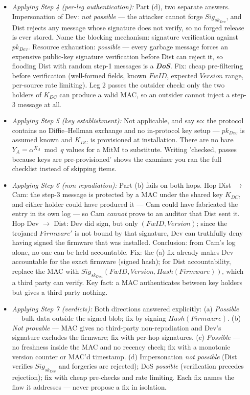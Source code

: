 \documentclass[12pt, a4paper]{article}
\newcommand{\term}[1]{\textbf{\textit{#1}}}        %
\begin{document}
\begin{itemize}
    \item \textit{Applying Step 4 (per-leg authentication):} Part (d), two separate answers. Impersonation of Dev: \emph{not possible} --- the attacker cannot forge $Sig_{sk_{Dev}}$, and Dist rejects any message whose signature does not verify, so no forged release is ever stored. Name the blocking mechanism: signature verification against $pk_{Dev}$. Resource exhaustion: \emph{possible} --- every garbage message forces an expensive public-key signature verification before Dist can reject it, so flooding Dist with random step-1 messages is a \term{DoS}. Fix: cheap pre-filtering before verification (well-formed fields, known $FwID$, expected $Version$ range, per-source rate limiting). Leg 2 passes the outsider check: only the two holders of $K_{DC}$ can produce a valid MAC, so an outsider cannot inject a step-3 message at all.
    \item \textit{Applying Step 5 (key establishment):} Not applicable, and say so: the protocol contains no Diffie--Hellman exchange and no in-protocol key setup --- $pk_{Dev}$ is assumed known and $K_{DC}$ is provisioned at installation. There are no bare $Y_A = \alpha^{X_A} \bmod q$ values for a MitM to substitute. Writing 'checked, passes because keys are pre-provisioned' shows the examiner you ran the full checklist instead of skipping items.
    \item \textit{Applying Step 6 (non-repudiation):} Part (b) fails on both hops. Hop Dist $\to$ Cam: the step-3 message is protected by a MAC under the shared key $K_{DC}$, and either holder could have produced it --- Cam could have fabricated the entry in its own log --- so Cam \emph{cannot} prove to an auditor that Dist sent it. Hop Dev $\to$ Dist: Dev did sign, but only $(FwID, Version)$; since the trojaned $Firmware'$ is not bound by that signature, Dev can truthfully deny having signed the firmware that was installed. Conclusion: from Cam's log alone, no one can be held accountable. Fix: the (a)-fix already makes Dev accountable for the exact firmware (signed hash); for Dist accountability, replace the MAC with $Sig_{sk_{Dist}}(FwID, Version, Hash(Firmware))$, which a third party can verify. Key fact: a MAC authenticates between key holders but gives a third party nothing.
    \item \textit{Applying Step 7 (verdicts):} Both directions answered explicitly: (a) \emph{Possible} --- bulk data outside the signed blob; fix by signing $Hash(Firmware)$. (b) \emph{Not provable} --- MAC gives no third-party non-repudiation and Dev's signature excludes the firmware; fix with per-hop signatures. (c) \emph{Possible} --- no freshness inside the MAC and no recency check; fix with a monotonic version counter or MAC'd timestamp. (d) Impersonation \emph{not possible} (Dist verifies $Sig_{sk_{Dev}}$ and forgeries are rejected); DoS \emph{possible} (verification precedes rejection); fix with cheap pre-checks and rate limiting. Each fix names the flaw it addresses --- never propose a fix in isolation.
\end{itemize}
\end{document}
